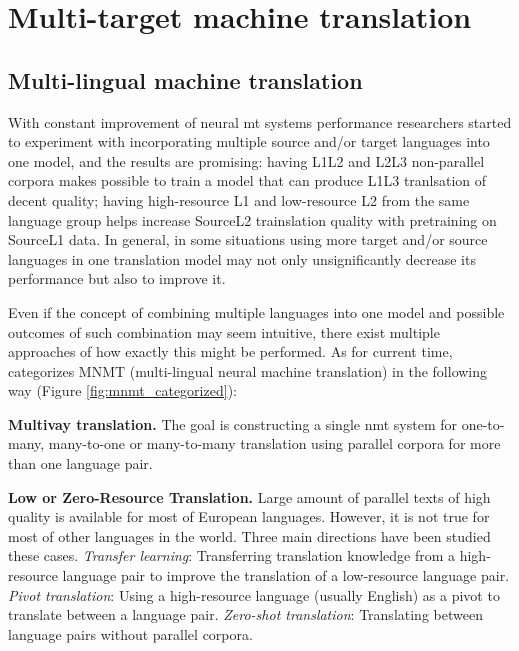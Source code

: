 \subsubsection*{}


\section{Multi-target machine translation}
\label{section:multitarget_mt}

\subsection{Multi-lingual machine translation}

With constant improvement of neural \acrshort{mt} systems performance researchers started to
experiment with incorporating multiple source and/or target languages into one model,
and the results are promising: having L1\to{}L2 and L2\to{}L3 non-parallel
corpora makes possible to train a model that can produce L1\to{}L3 tranlsation
of decent quality; having high-resource L1 and low-resource L2 from the same language
group helps increase Source\to{}L2 trainslation quality with pretraining on
Source\to{}L1 data.
In general, in some situations using more target and/or source languages in one translation
model may not only unsignificantly decrease its performance but also to improve it.

Even if the concept of combining multiple languages into one model and possible outcomes
of such combination may seem intuitive, there exist multiple approaches of how exactly
this might be performed. As for current time, \cite{Dabre2019} categorizes
MNMT (multi-lingual neural machine translation) in the following way
(Figure \ref{fig:mnmt_categorized}):

\textbf{Multivay translation.}
The goal is constructing a single \acrshort{nmt} system for
one-to-many, many-to-one or many-to-many
translation using parallel corpora for more than one language pair.

\textbf{Low or Zero-Resource Translation.}
Large amount of parallel texts of high quality is available for most of European
languages. However, it is not true for most of other languages in the world.
Three main directions have been studied these cases.
\textit{Transfer learning}: Transferring translation knowledge from a high-resource language pair
to improve the translation of a low-resource language pair.
\textit{Pivot translation}: Using a high-resource language (usually English) as a pivot to translate
between a language pair.
\textit{Zero-shot translation}: Translating between language pairs without parallel corpora.


